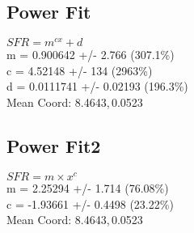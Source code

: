 \documentclass{article}
\begin{document}
		\subsection{Power Fit}
		\begin{minipage}[h]{0.6\textwidth}
				\begin{center}
					\begingroup{}
		  			\resizebox{\textwidth}{!}{%
						
		  			}\endgroup
				\end{center}
		\end{minipage}
		\begin{minipage}[h]{0.35\textwidth}
			$SFR = m^{c x} + d$ \\
			m               = 0.900642         +/- 2.766        (307.1\%) \\
			c               = 4.52148          +/- 134          (2963\%) \\
			d               = 0.0111741        +/- 0.02193      (196.3\%) \\

			Mean Coord: 8.4643,\,0.0523
		\end{minipage}

		\subsection{Power Fit2}
		\begin{minipage}[h]{0.6\textwidth}
				\begin{center}
					\begingroup{}
		  			\resizebox{\textwidth}{!}{%
						
		  			}\endgroup
				\end{center}
		\end{minipage}
		\begin{minipage}[h]{0.35\textwidth}
			$SFR = m\times x^{c}$ \\
			m               = 2.25294          +/- 1.714        (76.08\%) \\
			c               = -1.93661         +/- 0.4498       (23.22\%) \\

			Mean Coord: 8.4643,\,0.0523
		\end{minipage}
\end{document}
